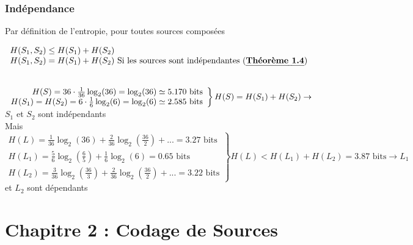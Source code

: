 \documentclass[11pt,a4paper]{article}
\begin{document}
\subsubsection{Indépendance}
Par définition de l'entropie, pour toutes sources composées
\begin{center}
$\begin{array}{ll}
	H(S_1,S_2) \leq H(S_1) + H(S_2)\\
	H(S_1,S_2) = H(S_1) + H(S_2)\text{ Si les sources sont indépendantes (\evid{Théorème 1.4})}
\end{array}$
\end{center}
\begin{exemple}~\\
	\label{H(L2)}
	$\left.\begin{array}{r}
		H(S) = 36\cdot \frac{1}{36} \log_2(36) = \log_2(36) \simeq 5.170 \text{ bits}\\
	H(S_1) = H(S_2) = 6\cdot \frac{1}{6} \log_2(6) = \log_2(6) \simeq 2.585 \text{ bits}
	\end{array}\right\}H(S) = H(S_1) + H(S_2) \\
	\to$ $S_1$ et $S_2$ sont indépendants\\
	Mais\\
	$\left.\begin{array}{r}
		H(L) = \frac{1}{36}\log_2(36) + \frac{2}{36}\log_2(\frac{36}{2}) + ... = 3.27\text{ bits}\\
		H(L_1) = \frac{5}{6}\log_2(\frac{6}{5}) + \frac{1}{6}\log_2(6) = 0.65 \text{ bits}\\
		H(L_2) = \frac{3}{36}\log_2(\frac{36}{3}) + \frac{2}{36}\log_2(\frac{36}{2}) + ... =3.22 \text{ bits}
	\end{array}	\right\} 	H(L) < H(L_1) + H(L_2) = 3.87 \text{ bits} 	 \to L_1$ et $L_2$ sont dépendants
\end{exemple}
\newpage

\section[Codage de Sources]{Chapitre 2 : Codage de Sources}
\end{document}
